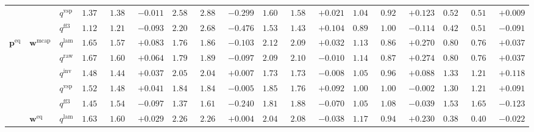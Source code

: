\documentclass[eng]{kjas3}
\begin{document}
\begin{table}[t]
{\begin{tabular}{lll ccc ccc ccc ccc ccc}
 &  & $q^{\mathrm{vsp}}$ & $1.377$ & $1.388$ & \cellcolor{negred!50}$-0.011$ & $2.585$ & $2.885$ & \cellcolor{negred!50}$-0.299$ & $1.603$ & $1.582$ & \cellcolor{posgreen!50}$+0.021$ & $1.045$ & $0.922$ & \cellcolor{posgreen!50}$+0.123$ & $0.525$ & $0.516$ & \cellcolor{posgreen!50}$+0.009$ \\
 &  & $q^{\mathrm{ff3}}$ & $1.122$ & $1.215$ & \cellcolor{negred!50}$-0.093$ & $2.204$ & $2.680$ & \cellcolor{negred!50}$-0.476$ & $1.535$ & $1.431$ & \cellcolor{posgreen!50}$+0.104$ & $0.892$ & $1.006$ & \cellcolor{negred!50}$-0.114$ & $0.428$ & $0.519$ & \cellcolor{negred!50}$-0.091$ \\
\midrule
$\mathbf{p}^{\mathrm{eq}}$ & $\mathbf{w}^{\mathrm{mcap}}$ & $q^{\mathrm{lam}}$ & $1.655$ & $1.572$ & \cellcolor{posgreen!50}$+0.083$ & $1.764$ & $1.867$ & \cellcolor{negred!50}$-0.103$ & $2.124$ & $2.092$ & \cellcolor{posgreen!50}$+0.032$ & $1.134$ & $0.863$ & \cellcolor{posgreen!50}$+0.270$ & $0.805$ & $0.768$ & \cellcolor{posgreen!50}$+0.037$ \\
 &  & $q^{\mathrm{raw}}$ & $1.670$ & $1.606$ & \cellcolor{posgreen!50}$+0.064$ & $1.796$ & $1.892$ & \cellcolor{negred!50}$-0.097$ & $2.097$ & $2.107$ & \cellcolor{negred!50}$-0.010$ & $1.146$ & $0.872$ & \cellcolor{posgreen!50}$+0.274$ & $0.805$ & $0.768$ & \cellcolor{posgreen!50}$+0.037$ \\
 &  & $q^{\mathrm{inv}}$ & $1.481$ & $1.444$ & \cellcolor{posgreen!50}$+0.037$ & $2.057$ & $2.049$ & \cellcolor{posgreen!50}$+0.007$ & $1.730$ & $1.738$ & \cellcolor{negred!50}$-0.008$ & $1.051$ & $0.963$ & \cellcolor{posgreen!50}$+0.088$ & $1.332$ & $1.214$ & \cellcolor{posgreen!50}$+0.118$ \\
 &  & $q^{\mathrm{vsp}}$ & $1.528$ & $1.487$ & \cellcolor{posgreen!50}$+0.041$ & $1.844$ & $1.849$ & \cellcolor{negred!50}$-0.005$ & $1.858$ & $1.765$ & \cellcolor{posgreen!50}$+0.092$ & $1.001$ & $1.003$ & \cellcolor{negred!50}$-0.002$ & $1.301$ & $1.210$ & \cellcolor{posgreen!50}$+0.091$ \\
 &  & $q^{\mathrm{ff3}}$ & $1.451$ & $1.548$ & \cellcolor{negred!50}$-0.097$ & $1.378$ & $1.618$ & \cellcolor{negred!50}$-0.240$ & $1.819$ & $1.889$ & \cellcolor{negred!50}$-0.070$ & $1.050$ & $1.088$ & \cellcolor{negred!50}$-0.039$ & $1.531$ & $1.653$ & \cellcolor{negred!50}$-0.123$ \\
\cmidrule(lr){2-18}
 & $\mathbf{w}^{\mathrm{eq}}$ & $q^{\mathrm{lam}}$ & $1.637$ & $1.608$ & \cellcolor{posgreen!50}$+0.029$ & $2.268$ & $2.264$ & \cellcolor{posgreen!50}$+0.004$ & $2.048$ & $2.087$ & \cellcolor{negred!50}$-0.038$ & $1.175$ & $0.945$ & \cellcolor{posgreen!50}$+0.230$ & $0.384$ & $0.406$ & \cellcolor{negred!50}$-0.022$ \\

\end{tabular}}
\end{table}
\end{document}
